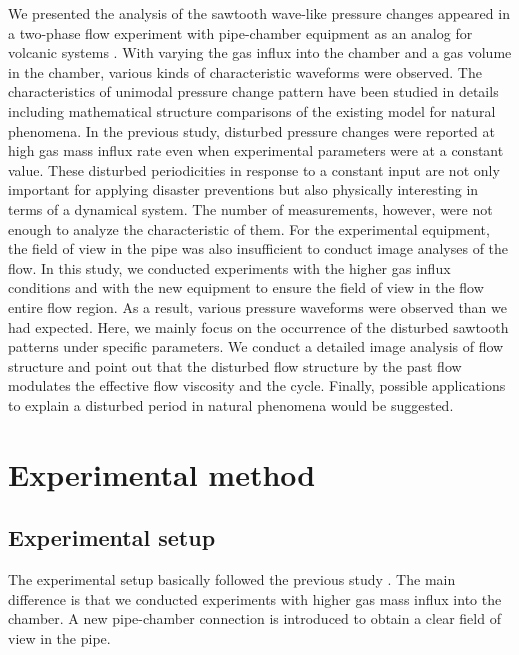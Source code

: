\documentclass[aps,pre,preprint,groupedaddress,showkeys]{revtex4-2}
\begin{document}
We presented the analysis of the sawtooth wave-like pressure changes appeared in a two-phase flow experiment with pipe-chamber equipment as an analog for volcanic systems \citep{kanno2018}.
With varying the gas influx into the chamber and a gas volume in the chamber, various kinds of characteristic waveforms were observed.
The characteristics of unimodal pressure change pattern have been studied in details including mathematical structure comparisons of the existing model for natural phenomena.
In the previous study, disturbed pressure changes were reported at high gas mass influx rate even when experimental parameters were at a constant value.
These disturbed periodicities in response to a constant input are not only important for applying disaster preventions but also physically interesting in terms of a dynamical system.
The number of measurements, however, were not enough to analyze the characteristic of them.
For the experimental equipment, the field of view in the pipe was also insufficient to conduct image analyses of the flow.
In this study, we conducted experiments with the higher gas influx conditions and with the new equipment to ensure the field of view in the flow entire flow region.
As a result, various pressure waveforms were observed than we had expected.
Here, we mainly focus on the occurrence of the disturbed sawtooth patterns under specific parameters.
We conduct a detailed image analysis of flow structure and point out that the disturbed flow structure by the past flow modulates the effective flow viscosity and the cycle.
Finally, possible applications to explain a disturbed period in natural phenomena would be suggested.

\section{Experimental method}\label{met}
\subsection{Experimental setup}\label{setup}
The experimental setup basically followed the previous study \citep{kanno2018}.
The main difference is that we conducted experiments with higher gas mass influx into the chamber. 
A new pipe-chamber connection is introduced to obtain a clear field of view in the pipe.
\end{document}

